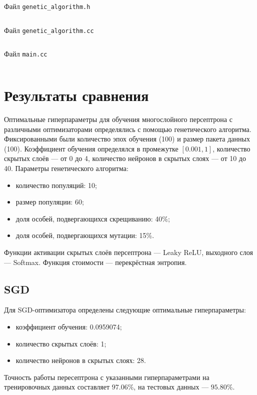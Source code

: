 \documentclass[a4paper, 14pt]{extarticle}
\newenvironment{longlisting}{\captionsetup{type=listing}}{}
\begin{document}
\begin{longlisting}
  \caption{Файл \texttt{genetic\_algorithm.h}}
  \inputminted{cpp}{../src/genetic_algorithm.h}
  \label{lst:genetic_algorithm.h}
\end{longlisting}

\begin{longlisting}
  \caption{Файл \texttt{genetic\_algorithm.cc}}
  \inputminted{cpp}{../src/genetic_algorithm.cc}
  \label{lst:genetic_algorithm.cc}
\end{longlisting}
 
\begin{longlisting}
  \caption{Файл \texttt{main.cc}}
  \inputminted{cpp}{../src/main.cc}
  \label{lst:main.cc}
\end{longlisting}

\section{Результаты сравнения}

Оптимальные гиперпараметры для обучения многослойного персептрона с различными оптимизаторами определялись с помощью генетического алгоритма.
Фиксированными были количество эпох обучения (100) и размер пакета данных (100). Коэффициент обучения определялся в промежутке $[0.001, 1]$,
количество скрытых слоёв --- от 0 до 4, количество нейронов в скрытых слоях --- от 10 до 40. Параметры генетического алгоритма:
\begin{itemize}
  \item количество популяций: 10;
  \item размер популяции: 60;
  \item доля особей, подвергающихся скрещиванию: 40\%;
  \item доля особей, подвергающихся мутации: 15\%.
\end{itemize}

Функции активации скрытых слоёв персептрона --- Leaky ReLU, выходного слоя --- Softmax. Функция стоимости --- перекрёстная энтропия.

\subsection{SGD}

Для SGD-оптимизатора определены следующие оптимальные гиперпараметры:
\begin{itemize}
  \item коэффициент обучения: 0.0959074;
  \item количество скрытых слоёв: 1;
  \item количество нейронов в скрытых слоях: 28.
\end{itemize}
Точность работы пересептрона с указанными гиперпараметрами на тренировочных данных составляет $97.06\%$, на тестовых данных --- $95.80\%$.
\end{document}

